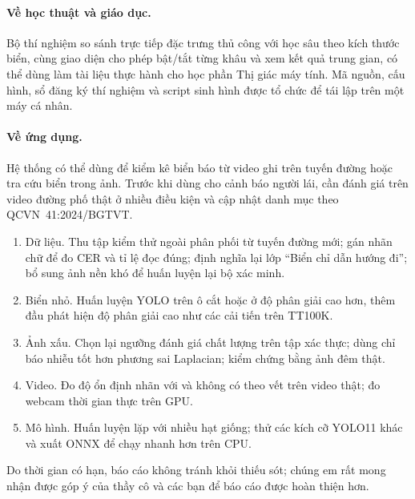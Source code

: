 \label{sec:impact}

\paragraph{Về học thuật và giáo dục.} Bộ thí nghiệm so sánh trực tiếp đặc trưng thủ công với học sâu theo kích thước biển, cùng giao diện cho phép bật/tắt từng khâu và xem kết quả trung gian, có thể dùng làm tài liệu thực hành cho học phần Thị giác máy tính. Mã nguồn, cấu hình, sổ đăng ký thí nghiệm và script sinh hình được tổ chức để tái lập trên một máy cá nhân.

\paragraph{Về ứng dụng.} Hệ thống có thể dùng để kiểm kê biển báo từ video ghi trên tuyến đường hoặc tra cứu biển trong ảnh. Trước khi dùng cho cảnh báo người lái, cần đánh giá trên video đường phố thật ở nhiều điều kiện và cập nhật danh mục theo QCVN~41:2024/BGTVT.

\label{sec:future}

\begin{enumerate}
 \item Dữ liệu. Thu tập kiểm thử ngoài phân phối từ tuyến đường mới; gán nhãn chữ để đo CER và tỉ lệ đọc đúng; định nghĩa lại lớp ``Biển chỉ dẫn hướng đi''; bổ sung ảnh nền khó để huấn luyện lại bộ xác minh.
 \item Biển nhỏ. Huấn luyện YOLO trên ô cắt hoặc ở độ phân giải cao hơn, thêm đầu phát hiện độ phân giải cao như các cải tiến trên TT100K.
 \item Ảnh xấu. Chọn lại ngưỡng đánh giá chất lượng trên tập xác thực; dùng chỉ báo nhiễu tốt hơn phương sai Laplacian; kiểm chứng bằng ảnh đêm thật.
 \item Video. Đo độ ổn định nhãn với và không có theo vết trên video thật; đo webcam thời gian thực trên GPU.
 \item Mô hình. Huấn luyện lặp với nhiều hạt giống; thử các kích cỡ YOLO11 khác và xuất ONNX để chạy nhanh hơn trên CPU.
\end{enumerate}

Do thời gian có hạn, báo cáo không tránh khỏi thiếu sót; chúng em rất mong nhận được góp ý của thầy cô và các bạn để báo cáo được hoàn thiện hơn.
